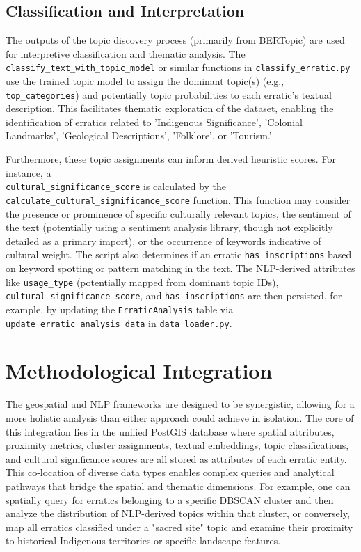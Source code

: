 \documentclass[
11pt, %
english, %
singlespacing, %
headsepline, %
]{MastersDoctoralThesis} %
\begin{document}
\subsection{Classification and Interpretation}
\label{subsec:classification_interpretation}

The outputs of the topic discovery process (primarily from BERTopic) are used for interpretive classification and thematic analysis. The \texttt{classify\_text\_with\_topic\_model} or similar functions in \texttt{classify\_erratic.py} use the trained topic model to assign the dominant topic(s) (e.g., \texttt{top\_categories}) and potentially topic probabilities to each erratic's textual description. This facilitates thematic exploration of the dataset, enabling the identification of erratics related to 'Indigenous Significance', 'Colonial Landmarks', 'Geological Descriptions', 'Folklore', or 'Tourism.'

Furthermore, these topic assignments can inform derived heuristic scores. For instance, a \\ \texttt{cultural\_significance\_score} is calculated by the \\ \texttt{calculate\_cultural\_significance\_score} function. This function may consider the presence or prominence of specific culturally relevant topics, the sentiment of the text (potentially using a sentiment analysis library, though not explicitly detailed as a primary import), or the occurrence of keywords indicative of cultural weight. The script also determines if an erratic \texttt{has\_inscriptions} based on keyword spotting or pattern matching in the text. The NLP-derived attributes like \texttt{usage\_type} (potentially mapped from dominant topic IDs), \texttt{cultural\_significance\_score}, and \texttt{has\_inscriptions} are then persisted, for example, by updating the \texttt{ErraticAnalysis} table via \texttt{update\_erratic\_analysis\_data} in \texttt{data\_loader.py}.

\section{Methodological Integration}
\label{sec:integration}

The geospatial and NLP frameworks are designed to be synergistic, allowing for a more holistic analysis than either approach could achieve in isolation. The core of this integration lies in the unified PostGIS database where spatial attributes, proximity metrics, cluster assignments, textual embeddings, topic classifications, and cultural significance scores are all stored as attributes of each erratic entity. This co-location of diverse data types enables complex queries and analytical pathways that bridge the spatial and thematic dimensions. For example, one can spatially query for erratics belonging to a specific DBSCAN cluster and then analyze the distribution of NLP-derived topics within that cluster, or conversely, map all erratics classified under a "sacred site" topic and examine their proximity to historical Indigenous territories or specific landscape features.
\end{document}
